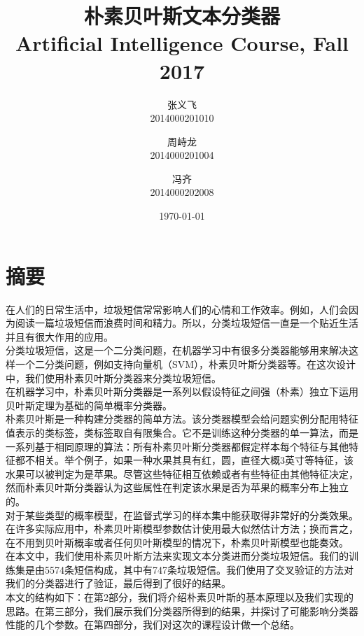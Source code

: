 \documentclass[a4paper, twocolumn, 12pt]{article}
\title{\huge {\textbf{朴素贝叶斯文本分类器}}\\[1ex]\small Artificial Intelligence Course, Fall 2017}
\author{
    张义飞\\2014000201010
    \and 周峙龙\\2014000201004
    \and 冯齐\\2014000202008
}
\date{\today}
\begin{document}
\maketitle

\section{摘要}

在人们的日常生活中，垃圾短信常常影响人们的心情和工作效率。例如，人们会因为阅读一篇垃圾短信而浪费时间和精力。所以，分类垃圾短信一直是一个贴近生活并且有很大作用的应用。\\

分类垃圾短信，这是一个二分类问题，在机器学习中有很多分类器能够用来解决这样一个二分类问题，例如支持向量机（SVM），朴素贝叶斯分类器等。在这次设计中，我们使用朴素贝叶斯分类器来分类垃圾短信。\\

在机器学习中，朴素贝叶斯分类器是一系列以假设特征之间强（朴素）独立下运用贝叶斯定理为基础的简单概率分类器。\\

朴素贝叶斯是一种构建分类器的简单方法。该分类器模型会给问题实例分配用特征值表示的类标签，类标签取自有限集合。它不是训练这种分类器的单一算法，而是一系列基于相同原理的算法：所有朴素贝叶斯分类器都假定样本每个特征与其他特征都不相关。举个例子，如果一种水果其具有红，圆，直径大概3英寸等特征，该水果可以被判定为是苹果。尽管这些特征相互依赖或者有些特征由其他特征决定，然而朴素贝叶斯分类器认为这些属性在判定该水果是否为苹果的概率分布上独立的。\\

对于某些类型的概率模型，在监督式学习的样本集中能获取得非常好的分类效果。在许多实际应用中，朴素贝叶斯模型参数估计使用最大似然估计方法；换而言之，在不用到贝叶斯概率或者任何贝叶斯模型的情况下，朴素贝叶斯模型也能奏效。\\

在本文中，我们使用朴素贝叶斯方法来实现文本分类进而分类垃圾短信。我们的训练集是由5574条短信构成，其中有747条垃圾短信。我们使用了交叉验证的方法对我们的分类器进行了验证，最后得到了很好的结果。\\

本文的结构如下：在第2部分，我们将介绍朴素贝叶斯的基本原理以及我们实现的思路。在第三部分，我们展示我们分类器所得到的结果，并探讨了可能影响分类器性能的几个参数。在第四部分，我们对这次的课程设计做一个总结。
\end{document}
